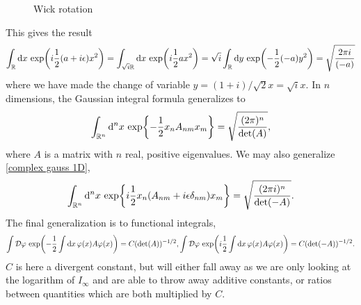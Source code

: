 \begin{figure}
    \centering
    \caption{Wick rotation}
    \label{Wick rotation}
\end{figure}
This gives the result
\begin{equation}
    \label{complex gauss 1D}
    \int_{\mathbb{R}} \dd x \, \exp(i \frac{1}{2}(a + i\epsilon) x^2) 
    = \int_{\sqrt{i}\mathbb{R}} \dd x \, \exp(i\frac{1}{2} ax^2)
    = \sqrt{i} \int_{\mathbb{R}} \dd y\, \exp(-\frac{1}{2} (-a) y^2) = \sqrt{\frac{2 \pi i}{(-a)}}
\end{equation}
where we have made the change of variable $y = (1+i)/\sqrt{2} x = \sqrt{i} x$.
In $n$ dimensions, the Gaussian integral formula generalizes to
\begin{equation}
    \int_{\mathbb{R}^n} \dd^n x \, \exp{-\frac{1}{2} x_n A_{nm} x_m } =\sqrt{\frac{(2 \pi)^n}{\det(A)}},
\end{equation}
where $A$ is a matrix with $n$ real, positive eigenvalues.
We may also generalize \autoref{complex gauss 1D},
\begin{align}
    \int_{\mathbb{R}^n} \dd^n x \, \exp{i\frac{1}{2} x_n( A_{nm} + i \epsilon \delta_{nm}) x_m } =\sqrt{\frac{(2 \pi i )^n}{\det(-A)}}.
\end{align}
The final generalization is to functional integrals,
\begin{align}
    \int \mathcal{D} \varphi \, \exp(- \frac{1}{2} \int \dd x \, \varphi(x) A \varphi(x) )
    = C (\det(A))^{-1/2},
    \int \mathcal{D} \varphi \, \exp(i\frac{1}{2} \int \dd x \, \varphi(x) A \varphi(x) )
    = C (\det(-A))^{-1/2}.
\end{align}
$C$ is here a divergent constant, but will either fall away as we are only looking at the logarithm of $I_\infty$ and are able to throw away additive constants, or ratios between quantities which are both multiplied by $C$.

